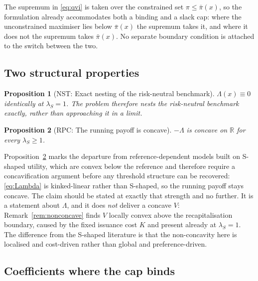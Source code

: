 \documentclass[11pt]{article}
\newtheorem{proposition}{Proposition}
\theoremstyle{remark}
\begin{document}
The supremum in \eqref{eq:qvi} is taken over the constrained set
$\pi \le \bar\pi(x)$, so the formulation already accommodates both a
binding and a slack cap: where the unconstrained maximiser lies below
$\bar\pi(x)$ the supremum takes it, and where it does not the supremum
takes $\bar\pi(x)$. No separate boundary condition is attached to the
switch between the two.

\subsection{Two structural properties}

\begin{proposition}[NST: Exact nesting of the risk-neutral benchmark]
\label{prop:nesting}
$\Lambda(x) \equiv 0$ identically at $\lambda_S = 1$. The problem therefore
\emph{nests} the risk-neutral benchmark exactly, rather than approaching it
in a limit.
\end{proposition}

\begin{proposition}[RPC: The running payoff is concave]
\label{prop:concave-payoff}
$-\Lambda$ is concave on $\mathbb{R}$ for every $\lambda_S \ge 1$.
\end{proposition}

\noindent
Proposition~\ref{prop:concave-payoff} marks the departure from
reference-dependent models built on S-shaped utility, which are convex
below the reference and therefore require a concavification argument
before any threshold structure can be recovered: \eqref{eq:Lambda} is
kinked-linear rather than S-shaped, so the running payoff stays concave.
The claim should be stated at exactly that strength and no further. It is
a statement about $\Lambda$, and it does \emph{not} deliver a concave $V$:
Remark~\ref{rem:nonconcave} finds $V$ locally convex above the
recapitalisation boundary, caused by the fixed issuance cost $K$ and
present already at $\lambda_S=1$. The difference from the S-shaped
literature is that the non-concavity here is localised and
cost-driven rather than global and preference-driven.

\subsection{Coefficients where the cap binds}
\label{sec:capcoef}
\end{document}
